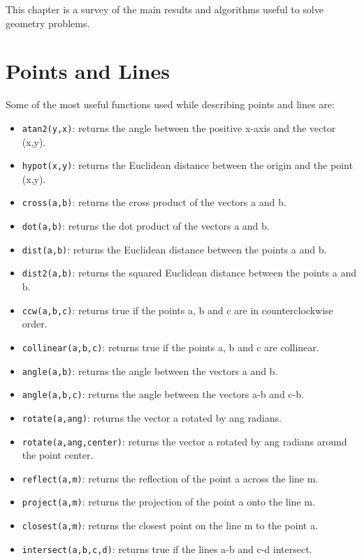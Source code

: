 This chapter is a survey of the main results and algorithms useful to solve geometry problems.

\section{Points and Lines}

Some of the most useful functions used while describing points and lines are:

\begin{itemize}
    \item \texttt{atan2(y,x)}: returns the angle between the positive x-axis and the vector (x,y).
    \item \texttt{hypot(x,y)}: returns the Euclidean distance between the origin and the point (x,y).
    \item \texttt{cross(a,b)}: returns the cross product of the vectors a and b.
    \item \texttt{dot(a,b)}: returns the dot product of the vectors a and b.
    \item \texttt{dist(a,b)}: returns the Euclidean distance between the points a and b.
    \item \texttt{dist2(a,b)}: returns the squared Euclidean distance between the points a and b.
    \item \texttt{ccw(a,b,c)}: returns true if the points a, b and c are in counterclockwise order.
    \item \texttt{collinear(a,b,c)}: returns true if the points a, b and c are collinear.
    \item \texttt{angle(a,b)}: returns the angle between the vectors a and b.
    \item \texttt{angle(a,b,c)}: returns the angle between the vectors a-b and c-b.
    \item \texttt{rotate(a,ang)}: returns the vector a rotated by ang radians.
    \item \texttt{rotate(a,ang,center)}: returns the vector a rotated by ang radians around the point center.
    \item \texttt{reflect(a,m)}: returns the reflection of the point a across the line m.
    \item \texttt{project(a,m)}: returns the projection of the point a onto the line m.
    \item \texttt{closest(a,m)}: returns the closest point on the line m to the point a.
    \item \texttt{intersect(a,b,c,d)}: returns true if the lines a-b and c-d intersect.
\end{itemize}

